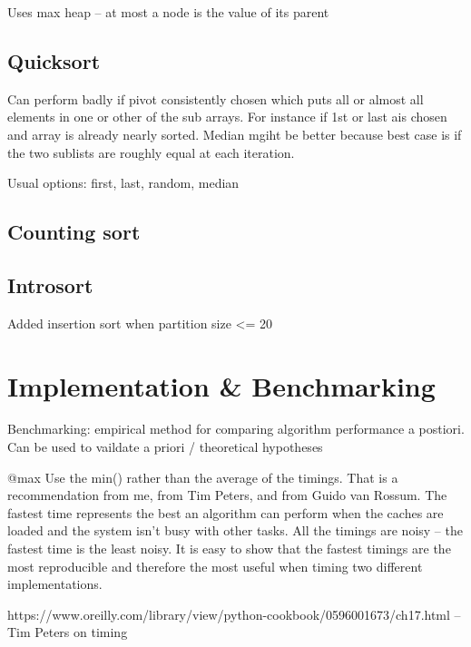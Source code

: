\documentclass[12pt, a4paper]{article}
\begin{document}
Uses max heap -- at most a node is the value of its parent
\subsection{Quicksort}

Can perform badly if pivot consistently chosen which puts all or almost all elements in one or other of the sub arrays. For instance if 1st or last ais chosen and array is already nearly sorted. Median mgiht be better because best case is if the two sublists are roughly equal at each iteration.

Usual options: first, last, random, median

\subsection{Counting sort}

\subsection{Introsort}

Added insertion sort when partition size <= 20 


\section{Implementation \& Benchmarking}

Benchmarking: empirical method for comparing algorithm performance a postiori. Can be used to vaildate a priori / theoretical hypotheses

@max Use the min() rather than the average of the timings. That is a recommendation from me, from Tim Peters, and from Guido van Rossum. The fastest time represents the best an algorithm can perform when the caches are loaded and the system isn't busy with other tasks. All the timings are noisy -- the fastest time is the least noisy. It is easy to show that the fastest timings are the most reproducible and therefore the most useful when timing two different implementations.

https://www.oreilly.com/library/view/python-cookbook/0596001673/ch17.html -- Tim Peters on timing
\end{document}
